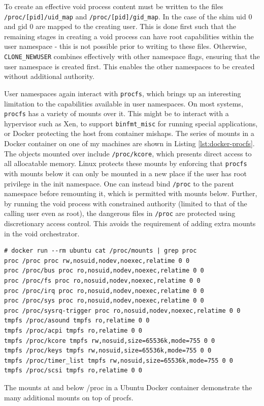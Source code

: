 \documentclass[12pt,a4paper,twoside]{report}
\begin{document}
To create an effective void process content must be written to the files \texttt{/proc/[pid]/uid\_map} and \texttt{/proc/[pid]/gid\_map}. In the case of the shim uid 0 and gid 0 are mapped to the creating user. This is done first such that the remaining stages in creating a void process can have root capabilities within the user namespace - this is not possible prior to writing to these files. Otherwise, \texttt{CLONE\_NEWUSER} combines effectively with other namespace flags, ensuring that the user namespace is created first. This enables the other namespaces to be created without additional authority.

User namespaces again interact with \texttt{procfs}, which brings up an interesting limitation to the capabilities available in user namespaces. On most systems, \texttt{procfs} has a variety of mounts over it. This might be to interact with a hypervisor such as Xen, to support \texttt{binfmt\_misc} for running special applications, or Docker protecting the host from container mishaps. The series of mounts in a Docker container on one of my machines are shown in Listing \ref{lst:docker-procfs}. The objects mounted over include \texttt{/proc/kcore}, which presents direct access to all allocatable memory. Linux protects these mounts by enforcing that \texttt{procfs} with mounts below it can only be mounted in a new place if the user has root privilege in the init namespace. One can instead bind \texttt{/proc} to the parent namespace before remounting it, which is permitted with mounts below. Further, by running the void process with constrained authority (limited to that of the calling user even as root), the dangerous files in \texttt{/proc} are protected using discretionary access control. This avoids the requirement of adding extra mounts in the void orchestrator.

\begin{listing}
\begin{verbatim}
# docker run --rm ubuntu cat /proc/mounts | grep proc
proc /proc proc rw,nosuid,nodev,noexec,relatime 0 0
proc /proc/bus proc ro,nosuid,nodev,noexec,relatime 0 0
proc /proc/fs proc ro,nosuid,nodev,noexec,relatime 0 0
proc /proc/irq proc ro,nosuid,nodev,noexec,relatime 0 0
proc /proc/sys proc ro,nosuid,nodev,noexec,relatime 0 0
proc /proc/sysrq-trigger proc ro,nosuid,nodev,noexec,relatime 0 0
tmpfs /proc/asound tmpfs ro,relatime 0 0
tmpfs /proc/acpi tmpfs ro,relatime 0 0
tmpfs /proc/kcore tmpfs rw,nosuid,size=65536k,mode=755 0 0
tmpfs /proc/keys tmpfs rw,nosuid,size=65536k,mode=755 0 0
tmpfs /proc/timer_list tmpfs rw,nosuid,size=65536k,mode=755 0 0
tmpfs /proc/scsi tmpfs ro,relatime 0 0
\end{verbatim}

\caption{The mounts at and below /proc in a Ubuntu Docker container demonstrate the many additional mounts on top of procfs.}
\label{lst:docker-procfs}
\end{listing}
\end{document}
